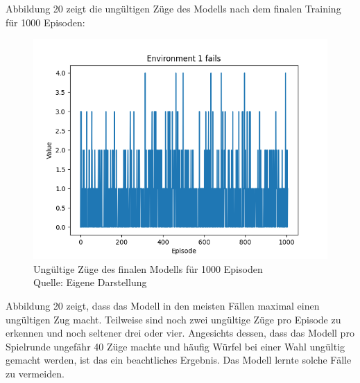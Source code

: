 Abbildung 20 zeigt die ungültigen Züge des Modells nach dem finalen Training für 1000 Episoden:
\nopagebreak
\begin{figure}[H]
	\includegraphics[width=1\textwidth]{Bilder/maskableppo_ganzschoenclever_193avg_v3.1f} 
	\caption[Ungültige Züge des finalen Modells für 1000 Episoden]{Ungültige Züge des finalen Modells für 1000 Episoden\\ Quelle: Eigene Darstellung}
\end{figure}

Abbildung 20 zeigt, dass das Modell in den meisten Fällen maximal einen ungültigen Zug macht. Teilweise sind noch zwei ungültige Züge pro Episode zu erkennen und noch seltener drei oder vier. Angesichts dessen, dass das Modell pro Spielrunde ungefähr 40 Züge machte und häufig Würfel bei einer Wahl ungültig gemacht werden, ist das ein beachtliches Ergebnis. Das Modell lernte solche Fälle zu vermeiden.\\

